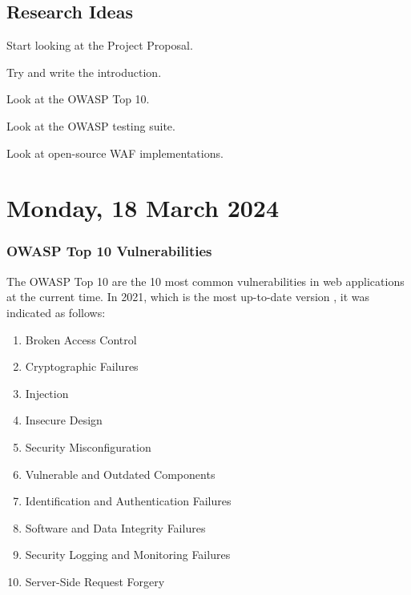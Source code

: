 \subsection{Research Ideas}

\begin{compactitem}
    \item Start looking at the Project Proposal.
    \item Try and write the introduction.
    \item Look at the OWASP Top 10.
    \item Look at the OWASP testing suite.
    \item Look at open-source WAF implementations.
\end{compactitem}


\pendsign

\section[2024/03/18]{Monday, 18 March 2024}

\subsubsection{OWASP Top 10 Vulnerabilities}

The OWASP Top 10 are the 10 most common vulnerabilities in web applications at the current time. In 2021, which is the most up-to-date version \cite{OWASPTOP10}, it was indicated as follows:

\begin{enumerate}
    \item Broken Access Control
    \item Cryptographic Failures
    \item Injection
    \item Insecure Design
    \item Security Misconfiguration
    \item Vulnerable and Outdated Components
    \item Identification and Authentication Failures
    \item Software and Data Integrity Failures
    \item Security Logging and Monitoring Failures
    \item Server-Side Request Forgery
\end{enumerate}

